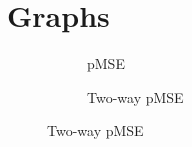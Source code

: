 \clearpage
\section{Graphs}

\begin{figure}[ht]
    \caption{Comparing Synthetic Data Generators (pMSE)}
    \label{fig:graph_fidelity_compare}
    \centering

    \begin{subfigure}{\textwidth}
        \caption{pMSE}
        \label{subfig:graph_fidelity_compare_dataset}
    \end{subfigure}

    \begin{subfigure}{\textwidth}
        \caption{Two-way pMSE}
        \label{subfig:graph_fidelity_compare_twoway}
    \end{subfigure}
\end{figure}


